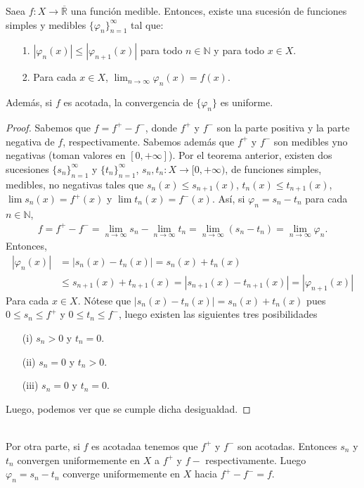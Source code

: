 \begin{cor}
Saea $f : X \longrightarrow \overline{\mathbb{R}}$ una función medible. Entonces, existe una sucesión de funciones simples y medibles $\{ \varphi_n\}_{n=1}^{\infty}$ tal que:
\begin{enumerate}
    \item[1.] $|\varphi_n(x)| \leq |\varphi_{n+1}(x)|$ para todo $n \in \mathbb{N}$ y para todo $x \in X$.
    \item[2.] Para cada $x \in X$, $\lim_{n \to \infty}{\varphi_n(x)} = f(x)$.
\end{enumerate}
Además, si $f$ es acotada, la convergencia de $\{\varphi_n\}$ es uniforme.
\end{cor}

\begin{proof}
Sabemos que $f = f^+ - f^-$, donde $f^+$ y $f^-$ son la parte positiva y la parte negativa de $f$, respectivamente. Sabemos además que $f^+$ y $f^-$ son medibles yno negativas (toman valores en $[0, +\infty]$). Por el teorema anterior, existen dos sucesiones $\{ s_n \}_{n=1}^{\infty}$ y $\{ t_n \}_{n=1}^{\infty}$, $s_n,t_n: X \longrightarrow [0,+\infty)$, de funciones simples, medibles, no negativas tales que $s_n(x) \leq s_{n+1}(x)$, $t_n(x) \leq t_{n+1}(x)$, $\lim{s_n(x)} = f^+(x)$ y $\lim{t_n(x)} = f^-(x)$. Así, si $\varphi_n = s_n - t_n$ para cada $n \in \mathbb{N}$,
\begin{align*}
    f = f^+ - f^- = \lim_{n \to \infty}{s_n} - \lim_{n \to \infty}{t_n} = \lim_{n \to \infty}{(s_n - t_n)} = \lim_{n \to \infty}{\varphi_n}.
\end{align*}
Entonces,
\begin{align*}
    |\varphi_n(x)| &= |s_n(x) - t_n(x)| = s_n(x) + t_n(x)\\
    &\leq s_{n+1}(x) + t_{n+1}(x) = |s_{n+1}(x)- t_{n+1}(x)| = |\varphi_{n+1}(x)|
\end{align*}
Para cada $x \in X$. Nótese que $|s_n(x) - t_n(x)| = s_n(x) + t_n(x)$ pues $0 \leq s_n \leq f^+$ y $0 \leq t_n \leq f^-$, luego existen las siguientes tres posibilidades
\begin{enumerate}
    \item[(i)]  $s_n > 0$ y $t_n = 0$.
    \item[(ii)] $s_n = 0$ y $t_n > 0$.
    \item[(iii)] $s_n = 0$ y $t_n = 0$.
\end{enumerate}
Luego, podemos ver que se cumple dicha desigualdad.
\end{proof}
\\
\newline
Por otra parte, si $f$ es acotadaa tenemos que $f^+$ y $f^-$ son acotadas. Entonces $s_n$  y $t_n$ convergen uniformemente en $X$ a $f^+$ y $f-$ respectivamente. Luego $\varphi_n = s_n - t_n$ converge uniformemente en $X$ hacia $f^+ - f^- = f$.

